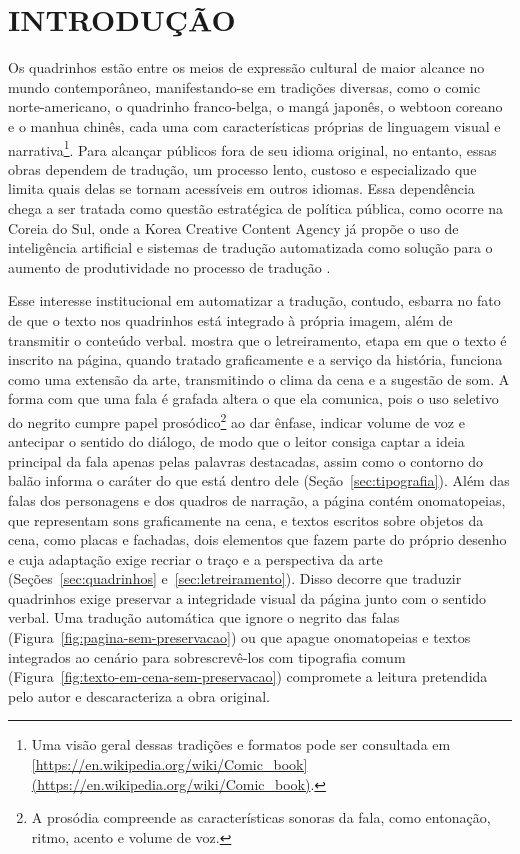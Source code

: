 \documentclass[
    12pt,
    openright,
    oneside,
    a4paper,
    chapter=TITLE,
    section=TITLE,
    english,
    brazilian,
    brazil
]{abntex2}
\renewcommand{\textual}{%
  \pagestyle{abntheadings}%
  \aliaspagestyle{chapter}{empty}%
  \nouppercaseheads%
  \bookmarksetup{startatroot}%
}
\begin{document}
\textual

\chapter{INTRODUÇÃO}
\label{cap:introducao}

Os quadrinhos estão entre os meios de expressão cultural de maior alcance no mundo contemporâneo, manifestando-se em tradições diversas, como o comic norte-americano, o quadrinho franco-belga, o mangá japonês, o webtoon coreano e o manhua chinês, cada uma com características próprias de linguagem visual e narrativa\footnote{Uma visão geral dessas tradições e formatos pode ser consultada em \url{[https://en.wikipedia.org/wiki/Comic_book](https://en.wikipedia.org/wiki/Comic_book)}.}. Para alcançar públicos fora de seu idioma original, no entanto, essas obras dependem de tradução, um processo lento, custoso e especializado que limita quais delas se tornam acessíveis em outros idiomas. Essa dependência chega a ser tratada como questão estratégica de política pública, como ocorre na Coreia do Sul, onde a Korea Creative Content Agency já propõe o uso de inteligência artificial e sistemas de tradução automatizada como solução para o aumento de produtividade no processo de tradução \cite{kocca2025kwebtoons}. 

Esse interesse institucional em automatizar a tradução, contudo, esbarra no fato de que o texto nos quadrinhos está integrado à própria imagem, além de transmitir o conteúdo verbal.  mostra que o letreiramento, etapa em que o texto é inscrito na página, quando tratado graficamente e a serviço da história, funciona como uma extensão da arte, transmitindo o clima da cena e a sugestão de som. A forma com que uma fala é grafada altera o que ela comunica, pois o uso seletivo do negrito cumpre papel prosódico\footnote{A prosódia compreende as características sonoras da fala, como entonação, ritmo, acento e volume de voz.} ao dar ênfase, indicar volume de voz e antecipar o sentido do diálogo, de modo que o leitor consiga captar a ideia principal da fala apenas pelas palavras destacadas, assim como o contorno do balão informa o caráter do que está dentro dele \cite{mccloud1993understanding} (Seção~\ref{sec:tipografia}). Além das falas dos personagens e dos quadros de narração, a página contém onomatopeias, que representam sons graficamente na cena, e textos escritos sobre objetos da cena, como placas e fachadas, dois elementos que fazem parte do próprio desenho e cuja adaptação exige recriar o traço e a perspectiva da arte (Seções~\ref{sec:quadrinhos} e~\ref{sec:letreiramento}). Disso decorre que traduzir quadrinhos exige preservar a integridade visual da página junto com o sentido verbal. Uma tradução automática que ignore o negrito das falas (Figura~\ref{fig:pagina-sem-preservacao}) ou que apague onomatopeias e textos integrados ao cenário para sobrescrevê-los com tipografia comum (Figura~\ref{fig:texto-em-cena-sem-preservacao}) compromete a leitura pretendida pelo autor e descaracteriza a obra original.
\end{document}
